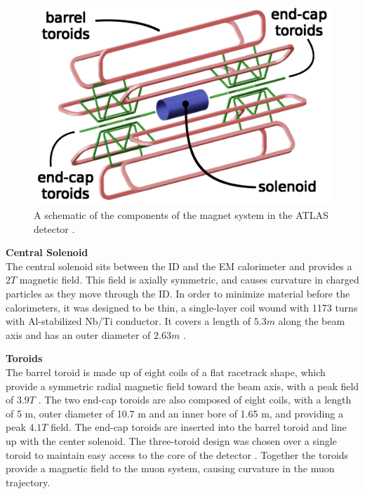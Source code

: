 \begin{figure}[!ht]
    \centering
    \includegraphics[width=.8\textwidth]{chapters/chapter2_experiment/images/magnetSystems.png}
    \caption[A schematic of the components of the magnet system in the ATLAS detector]{A schematic of the components of the magnet system in the ATLAS detector \cite{magnet-schematic}.}
    \label{fig:magnetSystem}
\end{figure}

\noindent\textbf{Central Solenoid}\\
\indent The central solenoid sits between the \gls{ID} and the \gls{EM} calorimeter and provides a $\unit{2}{T}$ magnetic field. This field is axially symmetric, and causes curvature in charged particles as they move through the \gls{ID}. In order to minimize material before the calorimeters, it was designed to be thin, a single-layer coil wound with 1173 turns with Al-stabilized Nb/Ti conductor. It covers a length of $\unit{5.3}{m}$ along the beam axis and has an outer diameter of $\unit{2.63}{m}$ \cite{central-solenoid}.

\noindent\textbf{Toroids}\\
\indent The barrel toroid is made up of eight coils of a flat racetrack shape, which provide a symmetric radial magnetic field toward the beam axis, with a peak field of $\unit{3.9}{T}$ \cite{barrel-toroid}. The two end-cap toroids are also composed of eight coils, with a length of 5 m, outer diameter of 10.7 m and an inner bore of 1.65 m, and providing a peak $\unit{4.1}{T}$ field. The end-cap toroids are inserted into the barrel toroid and line up with the center solenoid. The three-toroid design was chosen over a single toroid to maintain easy access to the core of the detector \cite{endcap-toroid}. Together the toroids provide a magnetic field to the muon system, causing curvature in the muon trajectory.


